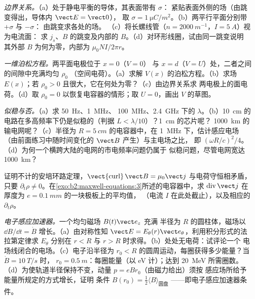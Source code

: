 \begin{exercise}[$\star\star$]\label{exo:b2:maxwell-equations:6}
\emph{边界关系。}（a）处于静电平衡的导体，其表面带有 $\sigma$：
紧贴表面外侧的场（由跳变得出，导体内 $\vect E = \vect 0$），
取 $\sigma = \qty{1}{\micro C/m^2}$。（b）两平行平面分别带 $+\sigma$ 与 $-\sigma$：
由跳变求各处的场。
（c）将长螺线管（$n = \qty{2000}{m^{-1}}$，$I = \qty{5}{A}$）视为电流面：
求 $j_s$、$B$ 的跳变及内部的 $B$。（d）对环形线圈，试由同一跳变说明
其外部 $B$ 为何为零，内部为 $\mu_0NI/2\pi r$。
\end{exercise}

\begin{exercise}[$\star\star$]\label{exo:b2:maxwell-equations:7}
\emph{一维泊松方程。}两平面电极位于 $x = 0$（$V = 0$）
与 $x = d$（$V = U$）处，二者之间的间隙中充满均匀 $\rho_0$
（空间电荷）。（a）求解 $V(x)$ 的泊松方程。（b）求场
$E(x)$；若 $\rho_0 > 0$ 且很大，它在何处为零？（c）由边界关系求
两电极上的面电荷。（d）取 $\rho_0 = 0$
以恢复电容器的情形；取 $U = 0$，画出 $V$ 的草图。
\end{exercise}

\begin{exercise}[$\star\star$]\label{exo:b2:maxwell-equations:8}
\emph{似稳与否。}（a）求 \qty{50}{Hz}、\qty{1}{MHz}、
\qty{100}{MHz}、\qty{2.4}{GHz} 下的 $\lambda$。（b）\qty{10}{cm}
的电路在多高频率下仍是似稳的（判据 $L < \lambda/10$）？\qty{1}{cm} 的芯片呢？
\qty{1000}{km} 的输电网呢？（c）半径为 $R = \qty{5}{cm}$ 的电容器中，在
\qty{1}{MHz} 下，估计感应电场（由前面练习中随时间变化的 $\vect B$ 产生）与主电场之比，
即 $(\omega R/c)^2
/4$。（d）为何一个横跨大陆的电网的市电频率问题仍属于
似稳问题，尽管电网宽达 \qty{1000}{km}？
\end{exercise}

\begin{exercise}[$\star\star$]\label{exo:b2:maxwell-equations:9}
证明不计的安培环路定理，$\operatorname{\vect{curl}}
\vect B = \mu_0\vect j$ 与电荷守恒相矛盾，只要 $\partial_t\rho
\ne 0$。在\cref{exo:b2:maxwell-equations:3}所述的电容器中，求
$\operatorname{div}\vect j$ 在厚度为 $e = \qty{0.1}{mm}$ 的一块极板上的平均值，
（电流 $I$ 在此处截止），以及相应的 $\partial_t\rho$。
\end{exercise}

\begin{exercise}[$\star\star\star$]\label{exo:b2:maxwell-equations:10}
\emph{电子感应加速器。}一个均匀磁场 $B(t)\vect e_z$ 充满
半径为 $R$ 的圆柱体，磁场以 $\dd B/\dd t = \dot B$ 增长。（a）由对称性知
$\vect E = E_\theta(r)\vect e_\theta$，利用积分形式的法拉第定律求 $E_\theta$
分别在 $r < R$ 与 $r > R$ 时求得。（b）处处无电荷：试评论一个
电场线闭合的电场。（c）电子沿半径为
$r_0 < R$ 的圆周运动，每圈获得多少能量？当 $\dot B = \qty{10}{T/s}$ 时，
$r_0 = \qty{0.5}{m}$：每圈能量（以 eV 计）；达到 \qty{20}{MeV} 所需圈数。
（d）为使轨道半径保持不变，动量 $p = eBr_0$（由磁力给出）须按
感应场所给予能量所规定的方式增长，证明
条件 $B(r_0) = \tfrac12\langle B\rangle_{\text{圆盘}}$
——即电子感应加速器条件。
\end{exercise}

